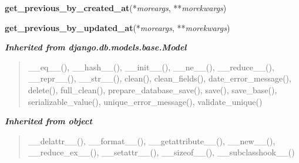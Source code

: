     \vspace{0.5ex}

\hspace{.8\funcindent}\begin{boxedminipage}{\funcwidth}

    \raggedright \textbf{get\_previous\_by\_created\_at}(*\textit{moreargs}, **\textit{morekwargs})

\setlength{\parskip}{2ex}
\setlength{\parskip}{1ex}
    \end{boxedminipage}

    \label{spatio_main:models:District:get_previous_by_updated_at}

    \vspace{0.5ex}

\hspace{.8\funcindent}\begin{boxedminipage}{\funcwidth}

    \raggedright \textbf{get\_previous\_by\_updated\_at}(*\textit{moreargs}, **\textit{morekwargs})

\setlength{\parskip}{2ex}
\setlength{\parskip}{1ex}
    \end{boxedminipage}


\large{\textbf{\textit{Inherited from django.db.models.base.Model}}}

\begin{quote}
\_\_eq\_\_(), \_\_hash\_\_(), \_\_init\_\_(), \_\_ne\_\_(), \_\_reduce\_\_(), \_\_repr\_\_(), \_\_str\_\_(), clean(), clean\_fields(), date\_error\_message(), delete(), full\_clean(), prepare\_database\_save(), save(), save\_base(), serializable\_value(), unique\_error\_message(), validate\_unique()
\end{quote}

\large{\textbf{\textit{Inherited from object}}}

\begin{quote}
\_\_delattr\_\_(), \_\_format\_\_(), \_\_getattribute\_\_(), \_\_new\_\_(), \_\_reduce\_ex\_\_(), \_\_setattr\_\_(), \_\_sizeof\_\_(), \_\_subclasshook\_\_()
\end{quote}


